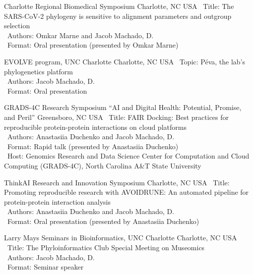 \documentclass[11pt, letterpaper, sans]{moderncv}
\begin{document}
    {Charlotte Regional Biomedical Symposium}
    {Charlotte, NC}
    {USA}
    {}
    {
        \textbullet~Title: The SARS-CoV-2 phylogeny is sensitive to alignment parameters and outgroup selection\\
        \textbullet~Authors: Omkar Marne and Jacob Machado, D.\\
        \textbullet~Format: Oral presentation (presented by Omkar Marne)
    }

    {EVOLVE program, UNC Charlotte}
    {Charlotte, NC}
    {USA}
    {}
    {
        \textbullet~Topic: Péva, the lab's phylogenetics platform\\
        \textbullet~Authors: Jacob Machado, D.\\
        \textbullet~Format: Oral presentation
    }

    {GRADS-4C Research Symposium ``AI and Digital Health: Potential, Promise, and Peril''}
    {Greensboro, NC}
    {USA}
    {}
    {
        \textbullet~Title: FAIR Docking: Best practices for reproducible protein-protein interactions on cloud platforms\\
        \textbullet~Authors: Anastasiia Duchenko and Jacob Machado, D.\\
        \textbullet~Format: Rapid talk (presented by Anastasiia Duchenko)\\
        \textbullet~Host: Genomics Research and Data Science Center for Computation and Cloud Computing (GRADS-4C), North Carolina A\&T State University
    }

    {ThinkAI Research and Innovation Symposium}
    {Charlotte, NC}
    {USA}
    {}
    {
        \textbullet~Title: Promoting reproducible research with AVOIDRUNE: An automated pipeline for protein-protein interaction analysis\\
        \textbullet~Authors: Anastasiia Duchenko and Jacob Machado, D.\\
        \textbullet~Format: Oral presentation (presented by Anastasiia Duchenko)
    }

    {Larry Mays Seminars in Bioinformatics, UNC Charlotte}
    {Charlotte, NC}
    {USA}
    {}
    {
        \textbullet~Title: The Phyloinformatics Club Special Meeting on Museomics\\
        \textbullet~Authors: Jacob Machado, D.\\
        \textbullet~Format: Seminar speaker
    }
\end{document}
